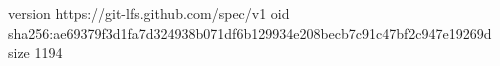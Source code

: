 version https://git-lfs.github.com/spec/v1
oid sha256:ae69379f3d1fa7d324938b071df6b129934e208becb7c91c47bf2c947e19269d
size 1194
